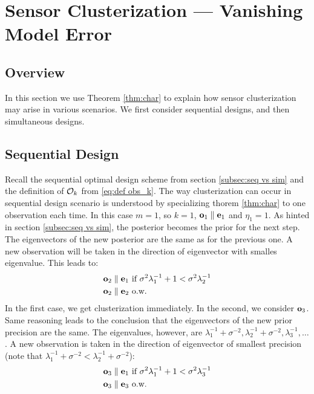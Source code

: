 \documentclass{amsart}
\numberwithin{equation}{section}
\begin{document}
\section{Sensor Clusterization --- Vanishing Model Error}\label{section:clusterization}
\subsection{Overview}
In this section we use Theorem \ref{thm:char} to explain how sensor
clusterization may arise in various scenarios. We first consider
sequential designs, and then simultaneous designs.



\subsection{Sequential Design}\label{subsec:clusterization sequential}
Recall the sequential optimal design scheme from section
\ref{subsec:seq vs sim} and the definition of $\mathcal{O}_k$ from
\eqref{eq:def obs_k}. The way clusterization can occur in sequential
design scenario is understood by specializing thorem \ref{thm:char} to
one observation each time. In this case $m=1$, so $k=1$, $\mathbf{o}_1
\parallel \mathbf{e}_1$ and $\eta_1 = 1$. As hinted in section
\ref{subsec:seq vs sim}, the posterior becomes the prior for the next
step. The eigenvectors of the new posterior are the same as for the
previous one. A new observation will be taken in the direction of
eigenvector with smalles eigenvalue. This leads to:
\begin{align*}
  \begin{split}
    \mathbf{o}_2 \parallel \mathbf{e}_1  &\text{ if } \sigma^2 \lambda^{-1}_1 + 1 < \sigma^2\lambda^{-1}_2 \\
    \mathbf{o}_2 \parallel \mathbf{e}_2  &\text{ o.w. }
  \end{split}
\end{align*}
In the first case, we get clusterization immediately. In the second,
we consider $\mathbf{o}_3$. Same reasoning leads to the conclusion that the
eigenvectors of the new prior precision are the same. The eigenvalues,
however, are $\lambda^{-1}_1 + \sigma^{-2}, \lambda^{-1}_2 +
\sigma^{-2}, \lambda_3^{-1}, \dots$. A new observation is taken in the
direction of eigenvector of smallest precision (note that
$\lambda^{-1}_1 + \sigma^{-2} < \lambda^{-1}_2 + \sigma^{-2}$):
\begin{align*}
  \begin{split}
    \mathbf{o}_3 \parallel \mathbf{e}_1 &\text{ if } \sigma^2 \lambda^{-1}_1 + 1 <
    \sigma^2\lambda^{-1}_3 \\
    \mathbf{o}_3 \parallel  \mathbf{e}_3  &\text{ o.w. }
  \end{split}
\end{align*}
\end{document}
